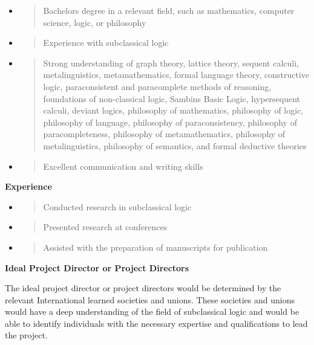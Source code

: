 \begin{itemize}
\item
  \begin{quote}
  Bachelor\textquotesingle s degree in a relevant field, such as
  mathematics, computer science, logic, or philosophy
  \end{quote}
\item
  \begin{quote}
  Experience with subclassical logic
  \end{quote}
\item
  \begin{quote}
  Strong understanding of graph theory, lattice theory, sequent calculi,
  metalinguistics, metamathematics, formal language theory, constructive
  logic, paraconsistent and paracomplete methods of reasoning,
  foundations of non-classical logic, Sambin\textquotesingle s Basic
  Logic, hypersequent calculi, deviant logics, philosophy of
  mathematics, philosophy of logic, philosophy of language, philosophy
  of paraconsistency, philosophy of paracompleteness, philosophy of
  metamathematics, philosophy of metalinguistics, philosophy of
  semantics, and formal deductive theories
  \end{quote}
\item
  \begin{quote}
  Excellent communication and writing skills
  \end{quote}
\end{itemize}

\textbf{Experience}

\begin{itemize}
\item
  \begin{quote}
  Conducted research in subclassical logic
  \end{quote}
\item
  \begin{quote}
  Presented research at conferences
  \end{quote}
\item
  \begin{quote}
  Assisted with the preparation of manuscripts for publication
  \end{quote}
\end{itemize}

\textbf{Ideal Project Director or Project Directors}

The ideal project director or project directors would be determined by
the relevant International learned societies and unions. These societies
and unions would have a deep understanding of the field of subclassical
logic and would be able to identify individuals with the necessary
expertise and qualifications to lead the project.

